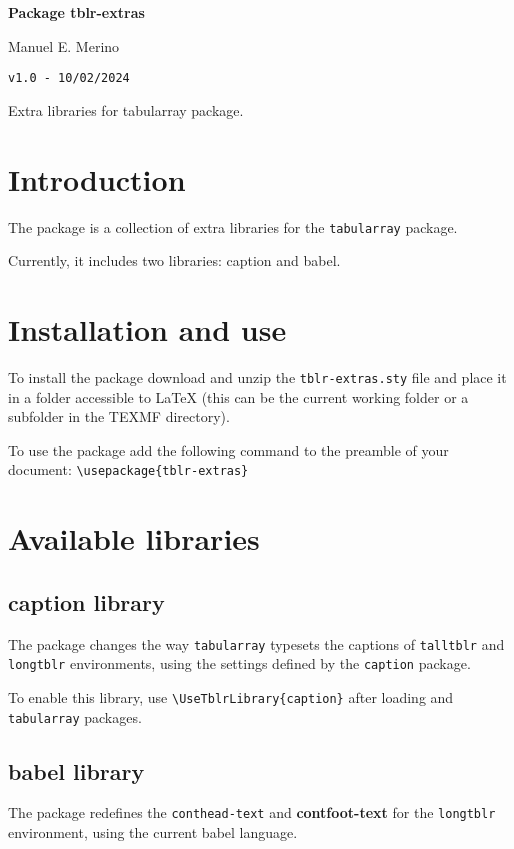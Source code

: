 \documentclass[a4paper,12pt]{article}
\newcommand{\Version}{1.0}
\begin{document}
	\begingroup%
	\centering
	\LARGE\textbf{Package \color{udep}tblr-extras}\par
	\large Manuel E. Merino\par
	\texttt{v\Version{} - 10/02/2024}\par
	\normalsize Extra libraries for tabularray package.\par
	\endgroup
	\tableofcontents
	\clearpage

	\section{Introduction}
	The \tblrextras{} package is a collection of extra libraries for the \texttt{tabularray} package.

	Currently, it includes two libraries: caption and babel.

	\section{Installation and use}

	To install the \tblrextras{} package download and unzip the \texttt{tblr-extras.sty} file and place it in a folder accessible to \LaTeX{} (this can be the current working folder or a subfolder in the TEXMF directory).

	To use the \tblrextras{} package add the following command to the preamble of your document: \verb|\usepackage{tblr-extras}|

	\section{Available libraries}
	\subsection{caption library}

	The \tblrextras{} package changes the way \texttt{tabularray} typesets the captions of \texttt{talltblr} and \texttt{longtblr} environments, using the settings defined by the \texttt{caption} package.

	To enable this library, use \verb*|\UseTblrLibrary{caption}| after loading \tblrextras{} and \texttt{tabularray} packages.

	\subsection{babel library}

	The \tblrextras{} package redefines the \texttt{conthead-text} and \textbf{contfoot-text} for the \texttt{longtblr} environment, using the current babel language.
\end{document}
